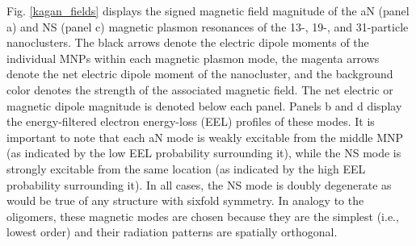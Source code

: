 \documentclass[journal=apchd5,manuscript=article]{achemso}
\begin{document}
Fig. \ref{kagan_fields} displays the signed magnetic field magnitude of the aN (panel a) and NS (panel c) magnetic plasmon resonances of the 13-, 19-, and 31-particle nanoclusters. The black arrows denote the electric dipole moments of the individual MNPs within each magnetic plasmon mode, the magenta arrows denote the net electric dipole moment of the nanocluster, and the background color denotes the strength of the associated magnetic field. The net electric or magnetic dipole magnitude is denoted below each panel. Panels b and d display the energy-filtered electron energy-loss (EEL) profiles of these modes. It is important to note that each aN mode is weakly excitable from the middle MNP (as indicated by the low EEL probability surrounding it), while the NS mode is strongly excitable from the same location (as indicated by the high EEL probability surrounding it). In all cases, the NS mode is doubly degenerate as would be true of any structure with sixfold symmetry. In analogy to the oligomers, these magnetic modes are chosen because they are the simplest (i.e., lowest order) and their radiation patterns are spatially orthogonal. 
\end{document}
